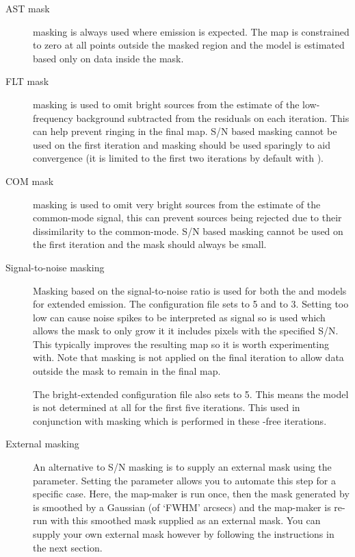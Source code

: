 \begin{description}
\item[AST mask]
 masking is always used where emission is expected. The map
is constrained to zero at all points outside the masked region and the
 model is estimated based only on data inside the mask.

\item[FLT mask]
 masking is used to omit bright sources from the estimate
of the low-frequency background subtracted from the residuals on each
iteration. This can help prevent ringing in the final map. S/N based
 masking cannot be used on the first iteration and
 masking should be used sparingly to aid convergence (it
is limited to the first two iterations by default with
).

\item[COM mask]
 masking is used to omit very bright sources from the
estimate of the common-mode signal, this can prevent sources being
rejected due to their dissimilarity to the common-mode. S/N based
 masking cannot be used on the first iteration and the
mask should always be small.

\item[Signal-to-noise masking]
Masking based on the signal-to-noise ratio is used for both the 
and  models for extended emission. The configuration file
 sets 
to 5 and  to 3. Setting 
too low can cause noise spikes to be interpreted as signal so
 is used which allows the mask to only grow it
it includes pixels with the specified S/N. This typically improves the
resulting map so it is worth experimenting with. Note that 
masking is not applied on the final iteration to allow data outside
the mask to remain in the final map.

The bright-extended configuration file also sets  to 5. This
means the  model is not determined at all for the first
five iterations. This used in conjunction with  masking
which is performed in these -free iterations.

\item[External masking]
An alternative to S/N masking is to supply an external mask using the
 parameter. Setting the parameter
 allows you to automate this step for a
specific case. Here, the map-maker is run once, then the mask
generated by  is smoothed by a Gaussian (of
`FWHM' arcsecs) and the map-maker is re-run with this smoothed mask
supplied as an external mask. You can supply your own external mask
however by following the instructions in the next section.


\end{description}
